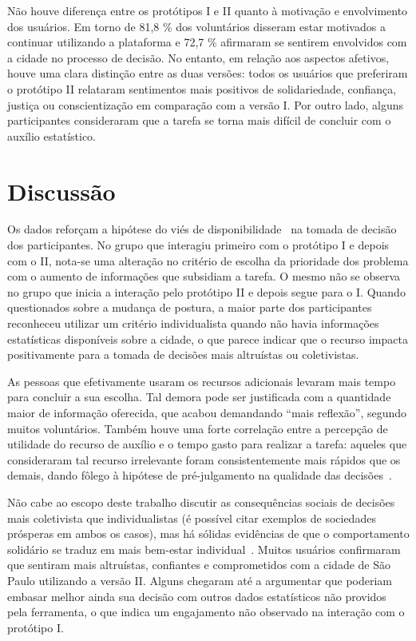 \documentclass{sigchi}
\begin{document}
Não houve diferença entre os protótipos I e II quanto à motivação e envolvimento dos usuários. Em torno de 81,8 \% dos voluntários disseram estar motivados a continuar utilizando a plataforma e 72,7 \% afirmaram se sentirem envolvidos com a cidade no processo de decisão. No entanto, em relação aos aspectos afetivos, houve uma clara distinção entre as duas versões: todos os usuários que preferiram o protótipo II relataram sentimentos mais positivos de solidariedade, confiança, justiça ou conscientização em comparação com a versão I. Por outro lado, alguns participantes consideraram que a tarefa se torna mais difícil de concluir com o auxílio estatístico.


\section{Discussão}
Os dados reforçam a hipótese do viés de disponibilidade~\cite{tversky:1973} na tomada de decisão dos participantes. No grupo que interagiu primeiro com o protótipo I e depois com o II, nota-se uma alteração no critério de escolha da prioridade dos problema com o aumento de informações que subsidiam a tarefa. O mesmo não se observa no grupo que inicia a interação pelo protótipo II e depois segue para o I. Quando questionados sobre a mudança de postura, a maior parte dos participantes reconheceu utilizar um critério individualista quando não havia informações estatísticas disponíveis sobre a cidade, o que parece indicar que o recurso impacta positivamente para a tomada de decisões mais altruístas ou coletivistas.

As pessoas que efetivamente usaram os recursos adicionais levaram mais tempo para concluir a sua escolha. Tal demora pode ser justificada com a quantidade maior de informação oferecida, que acabou demandando ``mais reflexão'', segundo muitos voluntários. Também houve uma forte correlação entre a percepção de utilidade do recurso de auxílio e o tempo gasto para realizar a tarefa: aqueles que consideraram tal recurso irrelevante foram consistentemente mais rápidos que os demais, dando fôlego à hipótese de pré-julgamento na qualidade das decisões~\cite{tversky:1986}.

Não cabe ao escopo deste trabalho discutir as consequências sociais de decisões mais coletivista que individualistas (é possível citar exemplos de sociedades prósperas em ambos os casos), mas há sólidas evidências de que o comportamento solidário se traduz em mais bem-estar individual~\cite{thoits:2001}. Muitos usuários confirmaram que sentiram mais altruístas, confiantes e comprometidos com a cidade de São Paulo utilizando a versão II. Alguns chegaram até a argumentar que poderiam embasar melhor ainda sua decisão com outros dados estatísticos não providos pela ferramenta, o que indica um engajamento não observado na interação com o protótipo I.
\end{document}
